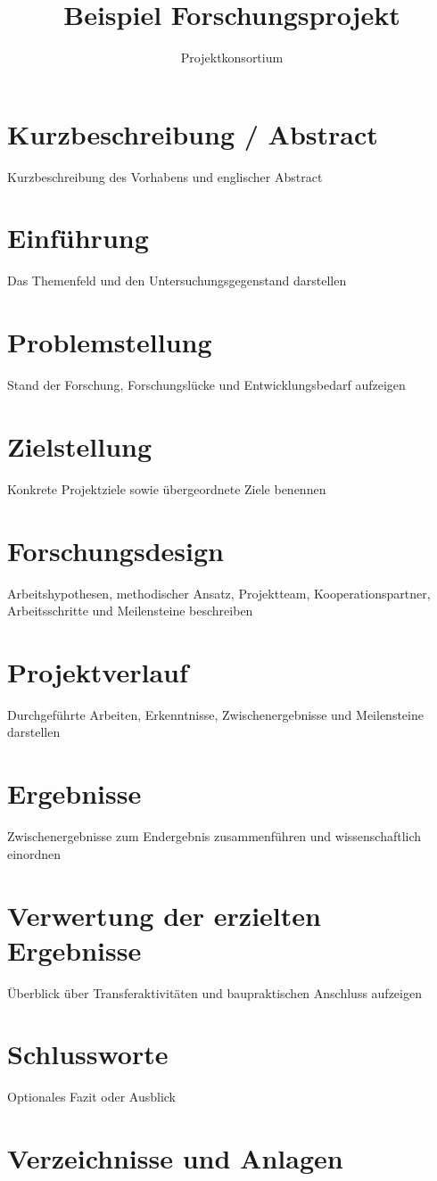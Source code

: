 \documentclass[type=forschungsbericht]{zukunftbau}
\title{Beispiel Forschungsprojekt}
\author{Projektkonsortium}
\begin{document}
\makecoverpages
\makefundingacknowledgement
\tableofcontents

\chapter*{Kurzbeschreibung / Abstract}
Kurzbeschreibung des Vorhabens und englischer Abstract

\chapter{Einführung}
Das Themenfeld und den Untersuchungsgegenstand darstellen

\chapter{Problemstellung}
Stand der Forschung, Forschungslücke und Entwicklungsbedarf aufzeigen

\chapter{Zielstellung}
Konkrete Projektziele sowie übergeordnete Ziele benennen

\chapter{Forschungsdesign}
Arbeitshypothesen, methodischer Ansatz, Projektteam, Kooperationspartner, Arbeitsschritte und Meilensteine beschreiben

\chapter{Projektverlauf}
Durchgeführte Arbeiten, Erkenntnisse, Zwischenergebnisse und Meilensteine darstellen

\chapter{Ergebnisse}
Zwischenergebnisse zum Endergebnis zusammenführen und wissenschaftlich einordnen

\chapter{Verwertung der erzielten Ergebnisse}
Überblick über Transferaktivitäten und baupraktischen Anschluss aufzeigen

\chapter{Schlussworte}
Optionales Fazit oder Ausblick

\appendix
\chapter{Verzeichnisse und Anlagen}
\end{document}
